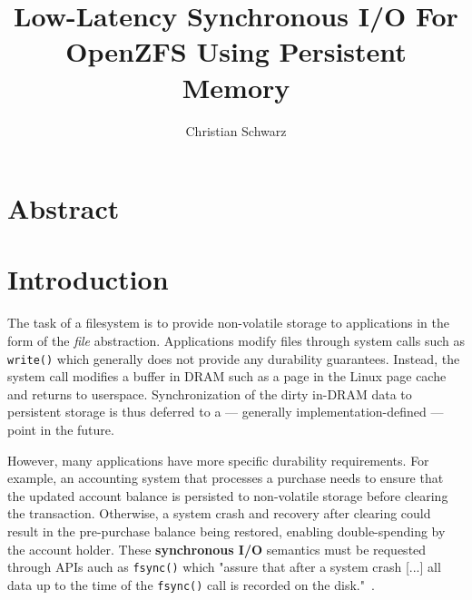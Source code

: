 \documentclass[12pt,a4paper,twoside]{book}
\begin{document}
\frontmatter
{}

\title{Low-Latency Synchronous I/O For OpenZFS Using Persistent Memory}
\author{Christian Schwarz}
\maketitle



\chapter{Abstract}
\blindtext

\mainmatter
\cleardoublepage
{}
{}
\tableofcontents

\chapter{Introduction}
The task of a filesystem is to provide non-volatile storage to applications in the form of the \textit{file} abstraction.
Applications modify files through system calls such as \lstinline{write()} which generally does not provide any durability guarantees.
Instead, the system call modifies a buffer in DRAM such as a page in the Linux page cache and returns to userspace.
Synchronization of the dirty in-DRAM data to persistent storage is thus deferred to a --- generally implementation-defined --- point in the future.

However, many applications have more specific durability requirements.
For example, an accounting system that processes a purchase needs to ensure that the updated account balance is persisted to non-volatile storage before clearing the transaction.
Otherwise, a system crash and recovery after clearing could result in the pre-purchase balance being restored, enabling double-spending by the account holder.
These \textbf{synchronous I/O} semantics must be requested through APIs auch as \lstinline{fsync()} which "assure that after a system crash [...] all data up to the time of the \lstinline{fsync()} call is recorded on the disk."~\cite{posix_fsync_opengroup}.
\end{document}
